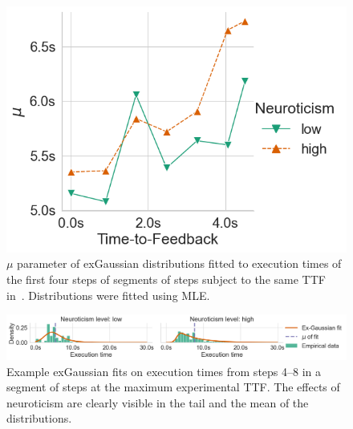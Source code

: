 \begin{figure}
    \centering
    \includegraphics[width=.9\textwidth]{figs/new_model/mu_fits_exgaussian_slice0}
    \caption{%
        \( \mu \) parameter of \gls{exGaussian} distributions fitted to execution times of the first four steps of segments of steps subject to the same \gls{TTF} in~\cite{olguinmunoz2021impact}.
        Distributions were fitted using \gls{MLE}.
    }\label{fig:muexgaussian}
\end{figure}

\begin{figure}
    \centering
    \includegraphics[width=\textwidth]{figs/new_model/dist_fits_neuro}
    \caption{%
        Example \gls{exGaussian} fits on execution times from steps \numrange{4}{8} in a segment of steps at the maximum experimental \gls{TTF}.
        The effects of neuroticism are clearly visible in the tail and the mean of the distributions.
    }\label{fig:fitsneuro}
\end{figure}

